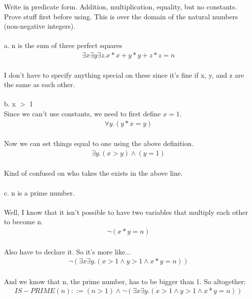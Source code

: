 \documentclass{article}
\begin{document}
Write in predicate form. Addition, multiplication, equality, but no constants. Prove stuff first before using. This is over the domain of the natural numbers (non-negative integers).
\\\\
a. n is the sum of three perfect squares \\
\begin {align*}
\exists x \exists y \exists z. x*x + y*y + z*z = n
\end {align*}
\\
I don't have to specify anything special on these since it's fine if x, y, and z are the same as each other. 
\\\\
b. x $>$ 1
\\
Since we can't use constants, we need to first define $x = 1$. 
\\
\begin {align*}
\forall y. (y*x = y)
\end {align*}
\\
Now we can set things equal to one using the above definition. 
\\
\begin {align*}
\exists y. (x > y) \wedge (y = 1)
\end {align*}
\\
Kind of confused on who takes the exists in the above line. 
\\\\
c. n is a prime number.
\\\\
Well, I know that it isn't possible to have two variables that multiply each other to become n. 
\\
\begin {align*}
\neg(x*y = n)
\end {align*}
\\
Also have to declare it. So it's more like...
\\
\begin {align*}
\neg (\exists x \exists y. (x > 1 \wedge y > 1 \wedge x*y = n))
\end {align*}
\\
And we know that n, the prime number, has to be bigger than 1. So altogether:
\\
\begin {align*}
IS-PRIME(n) ::= (n > 1) \wedge \neg (\exists x \exists y. (x > 1 \wedge y > 1 \wedge x*y = n))
\end {align*}
\\\\
\end{document}
